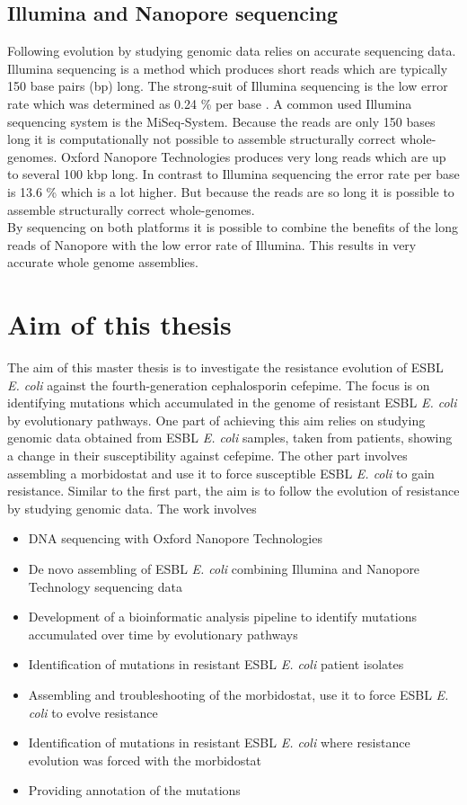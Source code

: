 \subsection{Illumina and Nanopore sequencing}
Following evolution by studying genomic data relies on accurate sequencing data. Illumina sequencing is a method which produces short reads which are typically 150 base pairs (bp) long. The strong-suit of Illumina sequencing is the low error rate which was determined as 0.24 \% per base \cite{pfeiffer_systematic_2018}. A common used Illumina sequencing system is the MiSeq-System. Because the reads are only 150 bases long it is computationally not possible to assemble structurally correct whole-genomes. 
Oxford Nanopore Technologies produces very long reads which are up to several 100 kbp long. In contrast to Illumina sequencing the error rate per base is 13.6 \% \cite{noauthor_resolving_nodate} which is a lot higher. But because the reads are so long it is possible to assemble structurally correct whole-genomes. \\
By sequencing on both platforms it is possible to combine the benefits of the long reads of Nanopore with the low error rate of Illumina. This results in very accurate whole genome assemblies.

\section{Aim of this thesis}
The aim of this master thesis is to investigate the resistance evolution of ESBL \textit{E. coli} against the fourth-generation cephalosporin cefepime. The focus is on identifying mutations which accumulated in the genome of resistant ESBL \textit{E. coli} by evolutionary pathways. One part of achieving this aim relies on studying genomic data obtained from ESBL \textit{E. coli} samples, taken from patients, showing a change in their susceptibility against cefepime. The other part involves assembling a morbidostat and use it to force susceptible ESBL \textit{E. coli} to gain resistance. Similar to the first part, the aim is to follow the evolution of resistance by studying genomic data. The work involves
\begin{itemize}
	\item DNA sequencing with Oxford Nanopore Technologies
	\item De novo assembling of ESBL \textit{E. coli} combining Illumina and Nanopore Technology sequencing data
	\item Development of a bioinformatic analysis pipeline to identify mutations accumulated over time by evolutionary pathways
	\item Identification of mutations in resistant ESBL \textit{E. coli} patient isolates
	\item Assembling and troubleshooting of the morbidostat, use it to force ESBL \textit{E. coli} to evolve resistance
	\item Identification of mutations in resistant ESBL \textit{E. coli} where resistance evolution was forced with the morbidostat
	\item Providing annotation of the mutations
\end{itemize}  